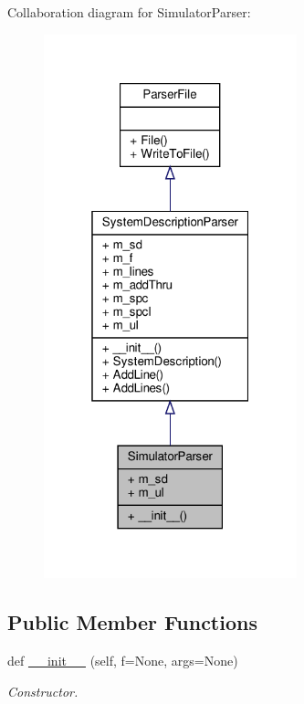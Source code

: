 Collaboration diagram for Simulator\+Parser\+:\nopagebreak
\begin{figure}[H]
\begin{center}
\leavevmode
\includegraphics[width=208pt]{classSignalIntegrity_1_1Parsers_1_1SimulatorParser_1_1SimulatorParser__coll__graph}
\end{center}
\end{figure}
\subsection*{Public Member Functions}
\begin{DoxyCompactItemize}
\item 
def \hyperlink{classSignalIntegrity_1_1Parsers_1_1SimulatorParser_1_1SimulatorParser_af9856388f7022892c3159ad55872a27e}{\+\_\+\+\_\+init\+\_\+\+\_\+} (self, f=None, args=None)
\begin{DoxyCompactList}\small\item\em Constructor. \end{DoxyCompactList}\end{DoxyCompactItemize}


